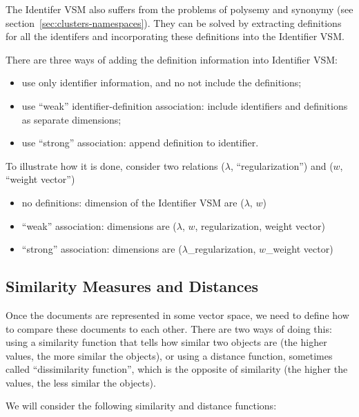 The Identifer VSM also suffers from the problems of polysemy
and synonymy (see section~\ref{sec:clusters-namespaces}). They
can be solved by extracting definitions for all the identifers
and incorporating these definitions into the Identifier VSM.

There are three ways of adding the definition information into
Identifier VSM:


\begin{itemize}
\itemsep1pt\parskip0pt
  \item use only identifier information, and no not include the definitions;
  \item use ``weak'' identifier-definition association: include identifiers and
        definitions as separate dimensions;
  \item use ``strong'' association: append definition to identifier.
\end{itemize}

To illustrate how it is done, consider two relations ($\lambda$, ``regularization'')
and ($w$, ``weight vector'')


\begin{itemize}\itemsep1pt\parskip0pt
  \item no definitions: dimension of the Identifier VSM are ($\lambda$, $w$)
  \item ``weak'' association:  dimensions are ($\lambda$, $w$, regularization, weight vector)
  \item ``strong'' association:  dimensions are ($\lambda$\_regularization, $w$\_weight vector)
\end{itemize}



\subsection{Similarity Measures and Distances} \label{sec:similarity-distance}

Once the documents are represented in some vector space, we need to
define how to compare these documents to each other. There are two
ways of doing this: using a similarity function that tells how similar
two objects are (the higher values, the more similar the objects),
or using a distance function, sometimes called ``dissimilarity function'',
which is the opposite of similarity (the higher the values, the less similar
the objects).

We will consider the following similarity and distance functions:


